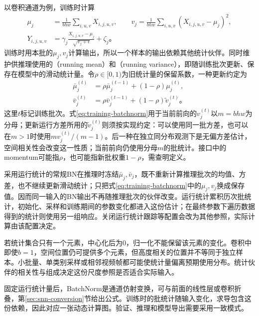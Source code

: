 以卷积通道为例，训练时计算
\begin{equation}
  \begin{aligned}
  \mu_j&=\frac1{bhw}\sum_{i,u,v}X_{i,j,u,v},\qquad
  v_j=\frac1{bhw}\sum_{i,u,v}(X_{i,j,u,v}-\mu_j)^2,\\
  Y_{i,j,u,v}&=\gamma_j\frac{X_{i,j,u,v}-\mu_j}{\sqrt{v_j+\epsilon}}+\zeta_j\text{。}
  \end{aligned}
  \label{eq:training-batchnorm}
\end{equation}
训练时用本批的$\mu_j,v_j$计算输出，所以一个样本的输出依赖其他统计伙伴。同时维护供推理使用的（running mean）和（running variance），即随训练批次更新、保存在模型中的滑动统计量。令$\rho\in[0,1)$为旧统计量的保留系数，一种更新约定为
\begin{equation}
  \begin{aligned}
    \bar\mu_j^{(t)}&=\rho\bar\mu_j^{(t-1)}+(1-\rho)\mu_j^{(t)},\\
    \bar v_j^{(t)}&=\rho\bar v_j^{(t-1)}+(1-\rho)\widetilde v_j^{(t)}\text{。}
  \end{aligned}
  \label{eq:training-batchnorm-running}
\end{equation}
这里$t$标记训练批次。式\eqref{eq:training-batchnorm}用于当前前向的$v_j^{(t)}$以$m=bhw$为分母；更新运行方差所用的$\widetilde v_j^{(t)}$则须按实现约定：可以使用同一批方差，也可以在$m>1$时使用$m v_j^{(t)}/(m-1)$。后一种在独立同分布观测下是无偏方差估计，空间相关性会改变这一性质；当前前向仍使用分母$m$的批统计。接口中的momentum可能指$\rho$，也可能指新批权重$1-\rho$，需查明定义。

采用运行统计的常规BN在推理时冻结$\bar\mu_j,\bar v_j$，既不重新计算推理批次的均值、方差，也不继续更新滑动统计；只把式\eqref{eq:training-batchnorm}中的$\mu_j,v_j$换成保存值。因而同一输入的BN输出不再随推理批次的伙伴改变。运行统计累积历次批统计，初始化、采样和训练期间的参数变化都进入这份估计；在最终参数下遍历数据得到的统计则使用另一组响应。关闭运行统计跟踪等配置会改为其他参照，实际计算由该配置决定。

若统计集合只有一个元素，中心化后为0，归一化不能保留该元素的变化。卷积中即使$b=1$，空间位置仍可提供多个元素，但高度相关的位置并不等同于独立样本。小批量、单类别采样或相邻视频帧都可能使统计量偏离预期使用分布。统计伙伴的相关性与组成决定这份尺度参照是否适合实际输入。

固定运行统计量后，BatchNorm是通道仿射变换，可与前面的线性层或卷积折叠，第\ref{sec:snn-conversion}节给出公式。训练时的批统计随输入变化，求导包含这份依赖，因此对应一张动态计算图。验证、推理和模型导出需要采用一致模式。

